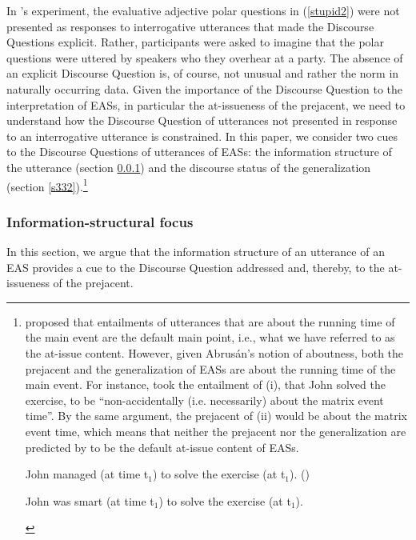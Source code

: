 \documentclass[11pt,fleqn]{article}
\newcommand{\6}{\mbox{$[\hspace*{-.6mm}[$}}
\newcommand{\9}{\mbox{$]\hspace*{-.6mm}]$}}
\newcommand{\citepos}[1]{\citeauthor{#1}'s \citeyear{#1}}
\begin{document}
In \citepos{tbd-variability} experiment, the evaluative adjective polar questions in (\ref{stupid2}) were not presented as responses to interrogative utterances that made the Discourse Questions explicit. Rather, participants were asked to imagine that the polar questions were uttered by speakers who they overhear at a party. The absence of an explicit Discourse Question is, of course, not unusual and rather the norm in naturally occurring data. Given the importance of the Discourse Question to the interpretation of EASs, in particular the at-issueness of the prejacent, we need to understand how the Discourse Question of utterances not presented in response to an interrogative utterance is constrained. In this paper, we consider two cues to the Discourse Questions of utterances of EASs: the information structure of the utterance (section \ref{s331}) and the discourse status of the generalization (section \ref{s332}).\footnote{\citet{abrusan2011} proposed that entailments of utterances that are about the running time of the main event are the default main point, i.e., what we have referred to as the at-issue content. However, given Abrus\'an's notion of aboutness, both the prejacent and the generalization of EASs are about the running time of the main event. For instance, \citet[508]{abrusan2011} took the entailment of (i), that John solved the exercise, to be ``non-accidentally (i.e. necessarily) about the matrix event time''. By the same argument, the prejacent of (ii) would be about the matrix event time, which means that neither the prejacent nor the generalization are predicted by \citealt{abrusan2011} to be the default at-issue content of EASs.



\begin{exe}
 John managed (at time t$_{\mbox{1}}$) to solve the exercise (at t$_{\mbox{1}}$). \hfill (\citealt[508]{abrusan2011})

 John was smart (at time t$_{\mbox{1}}$) to solve the exercise (at t$_{\mbox{1}}$).

\end{exe}}


\subsubsection{Information-structural focus}\label{s331}

In this section, we argue that the information structure of an utterance of an EAS provides a cue to the Discourse Question addressed and, thereby, to the at-issueness of the prejacent. 
\end{document}
